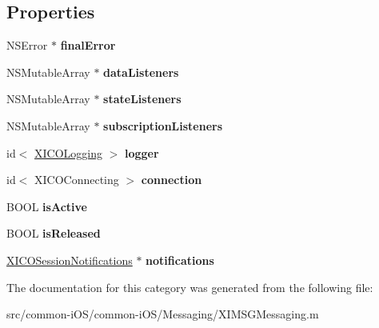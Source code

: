 \subsection*{Properties}
\begin{DoxyCompactItemize}
\item 
\hypertarget{category_x_i_m_s_g_messaging_07_08_a35eae344a6762cc890633bcd527aa525}{}\label{category_x_i_m_s_g_messaging_07_08_a35eae344a6762cc890633bcd527aa525} 
N\+S\+Error $\ast$ {\bfseries final\+Error}
\item 
\hypertarget{category_x_i_m_s_g_messaging_07_08_ac47714ab5b5bc8ecfb626fa6c9b48afb}{}\label{category_x_i_m_s_g_messaging_07_08_ac47714ab5b5bc8ecfb626fa6c9b48afb} 
N\+S\+Mutable\+Array $\ast$ {\bfseries data\+Listeners}
\item 
\hypertarget{category_x_i_m_s_g_messaging_07_08_adf176a6f931f3989cedfa4f8125bbb0f}{}\label{category_x_i_m_s_g_messaging_07_08_adf176a6f931f3989cedfa4f8125bbb0f} 
N\+S\+Mutable\+Array $\ast$ {\bfseries state\+Listeners}
\item 
\hypertarget{category_x_i_m_s_g_messaging_07_08_a5a6c1b3791ab180adbe1fc44766f61ce}{}\label{category_x_i_m_s_g_messaging_07_08_a5a6c1b3791ab180adbe1fc44766f61ce} 
N\+S\+Mutable\+Array $\ast$ {\bfseries subscription\+Listeners}
\item 
\hypertarget{category_x_i_m_s_g_messaging_07_08_ad80fd1674cfee90169afa6a0d3b0b5d1}{}\label{category_x_i_m_s_g_messaging_07_08_ad80fd1674cfee90169afa6a0d3b0b5d1} 
id$<$ \hyperlink{protocol_x_i_c_o_logging-p}{X\+I\+C\+O\+Logging} $>$ {\bfseries logger}
\item 
\hypertarget{category_x_i_m_s_g_messaging_07_08_a5c654664a7e2b6db9af6dfeaff6abe18}{}\label{category_x_i_m_s_g_messaging_07_08_a5c654664a7e2b6db9af6dfeaff6abe18} 
id$<$ X\+I\+C\+O\+Connecting $>$ {\bfseries connection}
\item 
\hypertarget{category_x_i_m_s_g_messaging_07_08_a3cd9835ba87a2ac43d6e6c615eee0aca}{}\label{category_x_i_m_s_g_messaging_07_08_a3cd9835ba87a2ac43d6e6c615eee0aca} 
B\+O\+OL {\bfseries is\+Active}
\item 
\hypertarget{category_x_i_m_s_g_messaging_07_08_a96963a942c355c3c8b2a51eb91e88980}{}\label{category_x_i_m_s_g_messaging_07_08_a96963a942c355c3c8b2a51eb91e88980} 
B\+O\+OL {\bfseries is\+Released}
\item 
\hypertarget{category_x_i_m_s_g_messaging_07_08_af643a2f48c562380b553d54af7ef090c}{}\label{category_x_i_m_s_g_messaging_07_08_af643a2f48c562380b553d54af7ef090c} 
\hyperlink{interface_x_i_c_o_session_notifications}{X\+I\+C\+O\+Session\+Notifications} $\ast$ {\bfseries notifications}
\end{DoxyCompactItemize}


The documentation for this category was generated from the following file\+:\begin{DoxyCompactItemize}
\item 
src/common-\/i\+O\+S/common-\/i\+O\+S/\+Messaging/X\+I\+M\+S\+G\+Messaging.\+m\end{DoxyCompactItemize}
